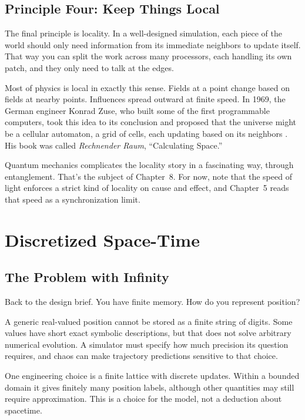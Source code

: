 \subsection{Principle Four: Keep Things Local}

The final principle is locality. In a well-designed simulation, each piece of the world should only need information from its immediate neighbors to update itself. That way you can split the work across many processors, each handling its own patch, and they only need to talk at the edges.

Most of physics is local in exactly this sense. Fields at a point change based on fields at nearby points. Influences spread outward at finite speed. In 1969, the German engineer Konrad Zuse, who built some of the first programmable computers, took this idea to its conclusion and proposed that the universe might be a cellular automaton, a grid of cells, each updating based on its neighbors \cite{zuse1969}. His book was called \emph{Rechnender Raum}, ``Calculating Space.''

Quantum mechanics complicates the locality story in a fascinating way, through entanglement. That's the subject of Chapter~8. For now, note that the speed of light enforces a strict kind of locality on cause and effect, and Chapter~5 reads that speed as a synchronization limit.

\section{Discretized Space-Time}

\subsection{The Problem with Infinity}

Back to the design brief. You have finite memory. How do you represent position?

A generic real-valued position cannot be stored as a finite string of digits. Some values have short exact symbolic descriptions, but that does not solve arbitrary numerical evolution. A simulator must specify how much precision its question requires, and chaos can make trajectory predictions sensitive to that choice.

One engineering choice is a finite lattice with discrete updates. Within a bounded domain it gives finitely many position labels, although other quantities may still require approximation. This is a choice for the model, not a deduction about spacetime.

